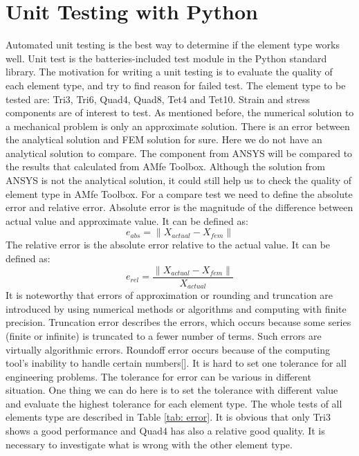\section{Unit Testing with Python}
Automated unit testing is the best way to determine if the element type works well. Unit test is the batteries-included test module in the Python standard library. The motivation for writing a unit testing is to evaluate the quality of each element type, and try to find reason for failed test. The element type to be tested are: Tri3, Tri6, Quad4, Quad8, Tet4 and Tet10. Strain and stress components are of interest to test. As mentioned before, the numerical solution to a mechanical problem is only an approximate solution. There is an error between the analytical solution and FEM solution for sure. Here we do not have an analytical solution to compare. The component from ANSYS will be compared to the results that calculated from AMfe Toolbox. Although the solution from ANSYS is not the analytical solution, it could still help us to check the quality of element type in AMfe Toolbox. For a compare test we need to define the absolute error and relative error. Absolute error is the magnitude of the difference between actual value and approximate value. It can be defined as:
\begin{equation}
e_{abs} = \|X_{actual} - X_{fem} \|
\end{equation}
The relative error is the absolute error relative to the actual value. It can be defined as:
\begin{equation}
e_{rel} = \frac{\|X_{actual} - X_{fem} \|}{X_{actual}}
\end{equation} 
It is noteworthy that errors of approximation or rounding and truncation are introduced by using numerical methods or algorithms and computing with finite precision. Truncation error describes the errors, which occurs because some series (finite or infinite) is truncated to a fewer number of terms. Such errors are virtually algorithmic errors. Roundoff error occurs because of the computing tool's inability to handle certain numbers[\cite{NumericalMethod}]. It is hard to set one tolerance for all engineering problems. The tolerance for error can be various in different situation. One thing we can do here is to set the tolerance with different value and evaluate the highest tolerance for each element type. The whole tests of all elements type are described in Table \ref{tab: error}. It is obvious that only Tri3 shows a good performance and Quad4 has also a relative good quality. It is necessary to investigate what is wrong with the other element type. 


